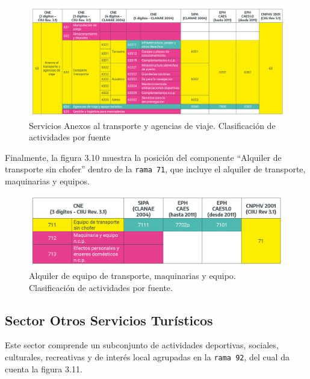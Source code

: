 \documentclass[
  openany]{book}
\begin{document}
\begin{figure}

{\centering \includegraphics[width=1\linewidth]{imagenes/figura3.9} 

}

\caption{Servicios Anexos al transporte y agencias de viaje. Clasificación de actividades por fuente}\label{fig:empleofuentes9}
\end{figure}

Finalmente, la figura 3.10 muestra la posición del componente ``Alquiler de transporte sin chofer'' dentro de la \texttt{rama\ 71}, que incluye el alquiler de transporte, maquinarias y equipos.

\begin{figure}

{\centering \includegraphics[width=1\linewidth]{imagenes/figura3.10} 

}

\caption{ Alquiler de equipo de transporte, maquinarias y equipo. Clasificación de actividades por fuente.}\label{fig:empleofuentes10}
\end{figure}

\hypertarget{sector-otros-servicios-turuxedsticos}{%
\subsection{Sector Otros Servicios Turísticos}\label{sector-otros-servicios-turuxedsticos}}

Este sector comprende un subconjunto de actividades deportivas, sociales, culturales, recreativas y de interés local agrupadas en la \texttt{rama\ 92}, del cual da cuenta la figura 3.11.
\end{document}
